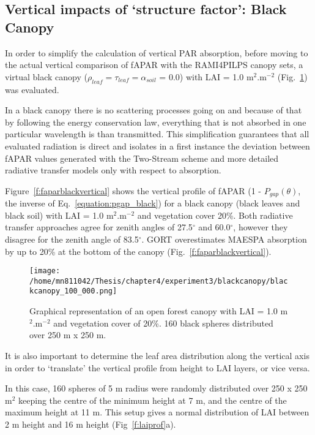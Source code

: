 \documentclass[a4paper,11pt]{report}
\begin{document}
\subsection{Vertical impacts of `structure factor': Black Canopy}
In order to simplify the calculation of vertical PAR absorption, before moving to the actual vertical comparison of fAPAR with the RAMI4PILPS canopy sets, a virtual black canopy ($\rho_{leaf} = \tau_{leaf} = \alpha_{soil}$ = 0.0) with LAI = 1.0 m$^2$.m$^{-2}$  (Fig.~\ref{f:blackcanopy}) was evaluated. 

In a black canopy there is no scattering processes going on and because of that by following the energy conservation law, everything that is not absorbed in one particular wavelength is than transmitted. This simplification guarantees that all evaluated radiation is direct and isolates in a first instance the deviation between fAPAR values generated with the Two-Stream scheme and more detailed radiative transfer models only with respect to absorption. 

Figure~\ref{f:faparblackvertical} shows the vertical profile of fAPAR (1 - $P_{gap}(\theta)$, the inverse of Eq.~\ref{equation:pgap_black}) for a black canopy (black leaves and black soil) with LAI = 1.0 m$^2$.m$^{-2}$ and vegetation cover 20\%. Both radiative transfer approaches agree for zenith angles of 27.5$^{\circ}$ and 60.0$^{\circ}$, however they disagree for the zenith angle of 83.5$^{\circ}$. GORT overestimates MAESPA absorption by up to 20\% at the bottom of the canopy (Fig.~\ref{f:faparblackvertical}).

\begin{figure}
\centering
\texttt{[image: /home/mn811042/Thesis/chapter4/experiment3/blackcanopy/blackcanopy\_100\_000.png]}
\caption{Graphical representation of an open forest canopy with LAI = 1.0 m$^2$.m$^{-2}$ and vegetation cover of 20\%. 160 black spheres distributed over 250 m x 250 m.}
\label{f:blackcanopy}
\end{figure}

It is also important to determine the leaf area distribution along the vertical axis in order to `translate' the vertical profile from height to LAI layers, or vice versa. 

In this case, 160 spheres of 5 m radius were randomly distributed over 250 x 250 m$^2$ keeping the centre of the minimum height at 7 m, and the centre of the maximum height at 11 m. This setup gives a normal distribution of LAI between 2 m height and 16 m height (Fig~\ref{f:laiprof}a).
\end{document}

